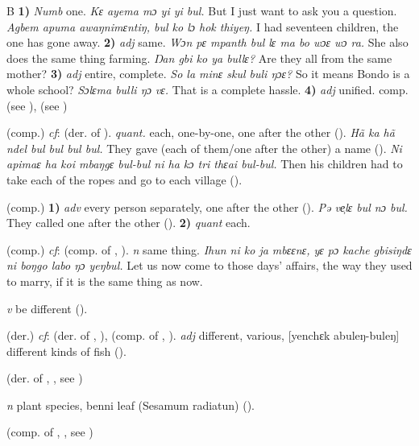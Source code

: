 \begin{letter}{B}
 \textbf{1)} \textit{Numb} one. \textit{Kɛ ayema mɔ yi yi bul.} But I just want to ask you a question. \textit{Agbem apuma awaŋnimɛntiŋ, bul ko lɔ hok thiyeŋ.} I had seventeen children, the one has gone away. \textbf{2)} \textit{adj} same. \textit{Wɔn pɛ mpanth bul lɛ ma bo wɔɛ wɔ ra.} She also does the same thing farming. \textit{Ŋan gbi ko ya bullɛ?} Are they all from the same mother? \textbf{3)} \textit{adj} entire, complete. \textit{So la minɛ skul buli ŋɔɛ?} So it means Bondo is a whole school? \textit{Sɔlɛma bulli ŋɔ vɛ.} That is a complete hassle. \textbf{4)} \textit{adj} unified. comp.  (see ),  (see ) 

 (comp.) \textit{cf}:  (der. of ). \textit{quant.} each, one-by-one, one after the other (\citealt{Pichl1967}). \textit{Hã ka hã ndel bul bul bul bul.} They gave (each of them/one after the other) a name (\citealt{Pichl1967}). \textit{Ni apimaɛ ha koi mbaŋgɛ bul-bul ni ha kɔ tri thɛai bul-bul.} Then his children had to take each of the ropes and go to each village (\citealt{Sumner1921}). 

 (comp.) \textbf{1)} \textit{adv} every person separately, one after the other (\citealt{Pichl1967}). \textit{Pə ve̹lɛ bul nɔ bul.} They called one after the other (\citealt{Pichl1967}). \textbf{2)} \textit{quant} each. 

 (comp.) \textit{cf}:  (comp. of , ). \textit{n} same thing. \textit{Ihun ni ko ja mbɛɛnɛ, yɛ pɔ kache gbisiŋdɛ ni boŋgo labo ŋɔ yeŋbul.} Let us now come to those days' affairs, the way they used to marry, if it is the same thing as now.

 \textit{v} be different (\citealt{Sumner1921}). 

 (der.) \textit{cf}:  (der. of , ),  (comp. of , ). \textit{adj} different, various, [yenchɛk abuleŋ-buleŋ] different kinds of fish (\citealt{Pichl1967}). 

 (der. of , , see ) 

 \textit{n} plant species, benni leaf (Sesamum radiatun) (\citealt{Pichl1967}). 

 (comp. of , , see )


\end{letter}
